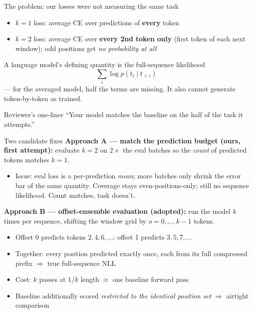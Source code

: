 \documentclass[10pt,aspectratio=169]{beamer}
\newcommand{\good}[1]{\textcolor{okgreen}{#1}}
\newcommand{\bad}[1]{\textcolor{warnred}{#1}}
\begin{document}
\begin{frame}{The problem: our losses were not measuring the same task}
  \begin{itemize}
    \item $k{=}1$ loss: average CE over predictions of \textbf{every} token
    \item $k{=}2$ loss: average CE over \textbf{every 2nd token only}
          (first token of each next window); odd positions get
          \emph{no probability at all}
  \end{itemize}

  \vspace{0.5em}
  A language model's defining quantity is the full-sequence likelihood
  \[
    \textstyle\sum_i \log p(t_i \mid t_{<i})
  \]
  --- for the averaged model, half the terms are \bad{missing}. It also cannot
  generate token-by-token as trained.

  \vspace{0.5em}
  \begin{alertblock}{Reviewer's one-liner}
    ``Your model matches the baseline on the half of the task it attempts.''
  \end{alertblock}
\end{frame}

\begin{frame}{Two candidate fixes}
  \textbf{Approach A --- match the prediction budget (ours, first attempt):}
  evaluate $k{=}2$ on $2\times$ the eval batches so the \emph{count} of
  predicted tokens matches $k{=}1$.
  \begin{itemize}
    \item \bad{Issue:} eval loss is a per-prediction \emph{mean}; more batches
          only shrink the error bar of the same quantity. Coverage stays
          even-positions-only; still no sequence likelihood. Count matches,
          task doesn't.
  \end{itemize}

  \vspace{0.6em}
  \textbf{Approach B --- offset-ensemble evaluation (adopted):}
  run the model $k$ times per sequence, shifting the window grid by
  $o = 0, \dots, k{-}1$ tokens.
  \begin{itemize}
    \item Offset 0 predicts tokens $2,4,6,\dots$; offset 1 predicts $3,5,7,\dots$
    \item Together: \good{every position predicted exactly once}, each from its
          full compressed prefix $\Rightarrow$ true full-sequence NLL
    \item Cost: $k$ passes at $1/k$ length $\approx$ one baseline forward pass
    \item Baseline additionally scored \emph{restricted to the identical
          position set} $\Rightarrow$ airtight comparison
  \end{itemize}
\end{frame}
\end{document}
